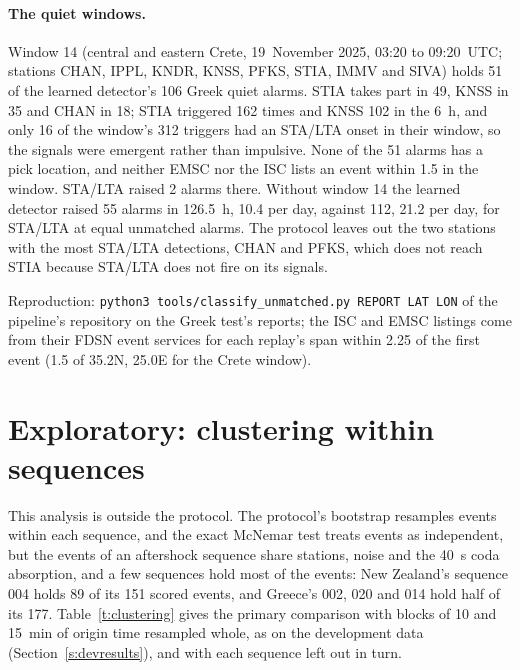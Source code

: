 \documentclass[11pt,a4paper]{article}
\newcommand{\stalta}{STA/LTA}
\newcommand{\tool}[1]{\nolinkurl{#1}}
\begin{document}
\paragraph{The quiet windows.} Window 14 (central and eastern Crete, 19~November 2025,
03:20 to 09:20~UTC; stations CHAN, IPPL, KNDR, KNSS, PFKS, STIA, IMMV and SIVA) holds
51 of the learned detector's 106 Greek quiet alarms. STIA takes part in 49, KNSS in
35 and CHAN in 18; STIA triggered 162 times and KNSS 102 in the 6~h, and only 16 of
the window's 312 triggers had an \stalta{} onset in their window, so the signals were
emergent rather than impulsive. None of the 51 alarms has a pick location, and neither
EMSC nor the ISC lists an event within 1.5\textdegree{} in the window. \stalta{}
raised 2 alarms there. Without window 14 the learned detector raised 55 alarms in
126.5~h, 10.4 per day, against 112, 21.2 per day, for \stalta{} at equal unmatched
alarms. The protocol leaves out the two stations with the most \stalta{} detections,
CHAN and PFKS, which does not reach STIA because \stalta{} does not fire on its
signals.

\noindent Reproduction: \tool{python3 tools/classify\_unmatched.py REPORT LAT LON} of
the pipeline's repository on the Greek test's reports; the ISC and EMSC listings
come from their FDSN event services for each replay's span within 2.25\textdegree{}
of the first event (1.5\textdegree{} of 35.2\textdegree N, 25.0\textdegree E for
the Crete window).

\section{Exploratory: clustering within sequences}\label{s:clustering}

This analysis is outside the protocol. The protocol's bootstrap resamples events
within each sequence, and the exact McNemar test treats events as independent, but
the events of an aftershock sequence share stations, noise and the 40~s coda
absorption, and a few sequences hold most of the events: New Zealand's sequence 004
holds 89 of its 151 scored events, and Greece's 002, 020 and 014 hold half of its 177.
Table~\ref{t:clustering} gives the primary comparison with blocks of 10 and 15~min of
origin time resampled whole, as on the development data (Section~\ref{s:devresults}),
and with each sequence left out in turn.
\end{document}
